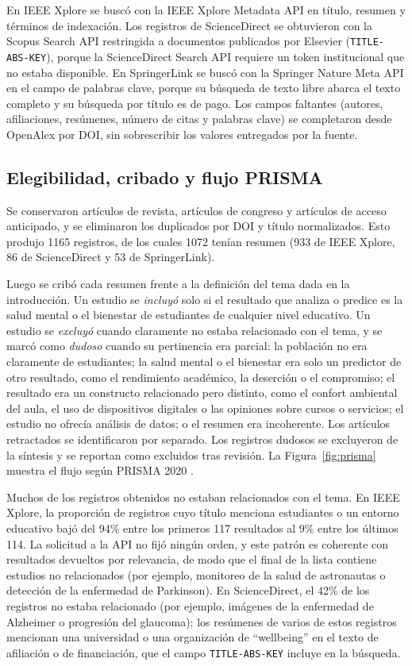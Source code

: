 \documentclass[11pt,a4paper]{article}
\begin{document}
En IEEE Xplore se buscó con la IEEE Xplore Metadata API en título, resumen y términos de indexación. Los registros de ScienceDirect se obtuvieron con la Scopus Search API restringida a documentos publicados por Elsevier (\texttt{TITLE-ABS-KEY}), porque la ScienceDirect Search API requiere un token institucional que no estaba disponible. En SpringerLink se buscó con la Springer Nature Meta API en el campo de palabras clave, porque su búsqueda de texto libre abarca el texto completo y su búsqueda por título es de pago. Los campos faltantes (autores, afiliaciones, resúmenes, número de citas y palabras clave) se completaron desde OpenAlex \cite{priem2022openalex} por DOI, sin sobrescribir los valores entregados por la fuente.

\subsection{Elegibilidad, cribado y flujo PRISMA}

Se conservaron artículos de revista, artículos de congreso y artículos de acceso anticipado, y se eliminaron los duplicados por DOI y título normalizados. Esto produjo 1165 registros, de los cuales 1072 tenían resumen (933 de IEEE Xplore, 86 de ScienceDirect y 53 de SpringerLink).

Luego se cribó cada resumen frente a la definición del tema dada en la introducción. Un estudio se \emph{incluyó} solo si el resultado que analiza o predice es la salud mental o el bienestar de estudiantes de cualquier nivel educativo. Un estudio se \emph{excluyó} cuando claramente no estaba relacionado con el tema, y se marcó como \emph{dudoso} cuando su pertinencia era parcial: la población no era claramente de estudiantes; la salud mental o el bienestar era solo un predictor de otro resultado, como el rendimiento académico, la deserción o el compromiso; el resultado era un constructo relacionado pero distinto, como el confort ambiental del aula, el uso de dispositivos digitales o las opiniones sobre cursos o servicios; el estudio no ofrecía análisis de datos; o el resumen era incoherente. Los artículos retractados se identificaron por separado. Los registros dudosos se excluyeron de la síntesis y se reportan como excluidos tras revisión. La Figura~\ref{fig:prisma} muestra el flujo según PRISMA 2020 \cite{page2021prisma}.

Muchos de los registros obtenidos no estaban relacionados con el tema. En IEEE Xplore, la proporción de registros cuyo título menciona estudiantes o un entorno educativo bajó del 94\% entre los primeros 117 resultados al 9\% entre los últimos 114. La solicitud a la API no fijó ningún orden, y este patrón es coherente con resultados devueltos por relevancia, de modo que el final de la lista contiene estudios no relacionados (por ejemplo, monitoreo de la salud de astronautas o detección de la enfermedad de Parkinson). En ScienceDirect, el 42\% de los registros no estaba relacionado (por ejemplo, imágenes de la enfermedad de Alzheimer o progresión del glaucoma); los resúmenes de varios de estos registros mencionan una universidad o una organización de ``wellbeing'' en el texto de afiliación o de financiación, que el campo \texttt{TITLE-ABS-KEY} incluye en la búsqueda.
\end{document}
